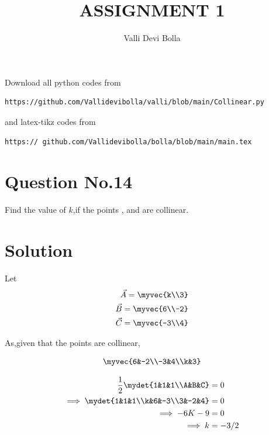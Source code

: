 \documentclass[journal,12pt,twocolumn]{IEEEtran}
\begin{document}
\def\rightbox#1{\makebox[0in][r]{#1}}
\def\centbox#1{\makebox[0in]{#1}}
\def\topbox#1{\raisebox{-\baselineskip}[0in][0in]{#1}}
\def\midbox#1{\raisebox{-0.5\baselineskip}[0in][0in]{#1}}
\vspace{3cm}
\title{ASSIGNMENT 1}
\author{Valli Devi Bolla}
\maketitle
\newpage
\bigskip
\renewcommand{\thefigure}{\theenumi}
\renewcommand{\thetable}{\theenumi}
Download all python codes from
\begin{lstlisting}
https://github.com/Vallidevibolla/valli/blob/main/Collinear.py
\end{lstlisting}
%
and latex-tikz codes from
%
\begin{lstlisting}
https:// github.com/Vallidevibolla/bolla/blob/main/main.tex
\end{lstlisting}
%
\section{Question No.14}

Find the value of $k$,if the points , 
 and  are collinear.

\section{Solution}

Let
\begin{align}
\vec{A}=\myvec{k\\3} \\
\vec{B}=\myvec{6\\-2}\\
\vec{C}=\myvec{-3\\4}
\end{align}
 
As,given that the points are collinear,

\begin{align}
\myvec{6&-2\\-3&4\\k&3}
\end{align}

\begin{align}
\frac{1}{2}\mydet{1&1&1\\A&B&C}&=0\\
\implies\mydet{1&1&1\\k&6&-3\\3&-2&4}&=0\\
\implies -6K-9&=0\\
\implies {k}&={-3/2}
\end{align}
\end{document}
